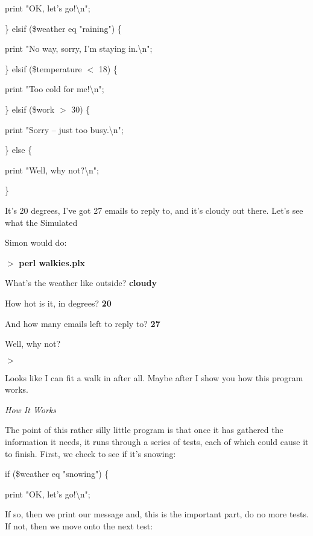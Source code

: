 \documentclass[a4paper,11pt]{book}
\begin{document}
\noindent print "OK, let's go!\textbackslash n";

\noindent \} elsif (\$weather eq "raining") \{

\noindent print "No way, sorry, I'm staying in.\textbackslash n";

\noindent \} elsif (\$temperature $<$ 18) \{

\noindent print "Too cold for me!\textbackslash n";

\noindent \} elsif (\$work $>$ 30) \{

\noindent print "Sorry -- just too busy.\textbackslash n";

\noindent \} else \{

\noindent print "Well, why not?\textbackslash n";

\noindent \}

\noindent 

\noindent It's 20 degrees, I've got 27 emails to reply to, and it's cloudy out there. Let's see what the Simulated

\noindent Simon would do:

\noindent 

\noindent $>$ \textbf{perl walkies.plx}

\noindent What's the weather like outside? \textbf{cloudy}

\noindent How hot is it, in degrees? \textbf{20}

\noindent And how many emails left to reply to? \textbf{27}

\noindent Well, why not?

\noindent $>$

\noindent 

\noindent Looks like I can fit a walk in after all. Maybe after I show you how this program works.

\noindent 

\noindent \textit{How It Works}

\noindent The point of this rather silly little program is that once it has gathered the information it needs, it runs through a series of tests, each of which could cause it to finish. First, we check to see if it's snowing:

\noindent 

\noindent if (\$weather eq "snowing") \{

\noindent print "OK, let's go!\textbackslash n";

\noindent 

\noindent If so, then we print our message and, this is the important part, do no more tests. If not, then we move onto the next test:
\end{document}
